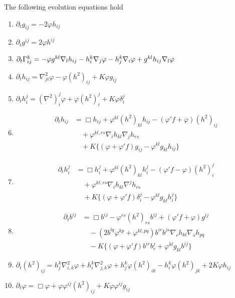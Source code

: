 \documentclass{amsart}
\begin{document}
\begin{lemma}
\label{lem:evolution}
The following evolution equations hold
\begin{enumerate}
\item \label{eq:delt_metric} $\partial_tg_{ij} = -2\varphi h_{ij}$
\item \label{eq:delt_inversemetric} $\partial_t g^{ij} = 2\varphi h^{ij}$
\item \label{eq:delt_christoffel} $\partial_t {\Gamma}^{k}_{ij} = -\varphi g^{kl} \nabla_l h_{ij} - h^k_i \nabla_j \varphi - h^k_j \nabla_i \varphi + g^{kl} h_{ij} \nabla_l \varphi$
\item \label{eq:delt_sff} $\partial_t h_{ij} = \nabla^2_{ji} \varphi - \varphi(h^2)_{ij} + K \varphi g_{ij}$
\item \label{eq:delt_weingarten} $\partial_t h_i^j = (\nabla^2)^j_i\varphi + \varphi(h^2)_i^j + K \varphi\delta_i^j$
\item \label{eq:delt_sff_box} \begin{align*}
\partial_t h_{ij} &= \Box h_{ij} + \varphi^{kl} (h^2)_{kl} h_{ij} - (\varphi'f + \varphi) (h^2)_{ij} \\
& \quad + \varphi^{kl,rs}\nabla_i h_{kl}\nabla_j h_{rs} \\
& \quad + K \{(\varphi + \varphi'f) g_{ij} - \varphi^{kl}g_{kl}h_{ij}\}
\end{align*}
\item \label{eq:delt_weingarten_box} \begin{align*}
\partial_t h_i^j &= \Box h_i^j + \varphi^{kl} (h^2)_{kl} h_i^j - (\varphi'f - \varphi) (h^2)_i^j \\
& \quad + \varphi^{kl,rs}\nabla_i h_{kl}\nabla^j h_{rs} \\
& \quad + K \{(\varphi + \varphi'f) \delta_i^j - \varphi^{kl}g_{kl}h_i^j\}
\end{align*}
\item \label{eq:delt_inversesff} \begin{align*}
\partial_t b^{ij} &= \Box b^{ij} - \varphi^{rs} (h^2)_{rs} b^{ij} + (\varphi'f + \varphi) g^{ij} \\  
& \quad - \left(2b^{lq}\varphi^{kp} + \varphi^{kl,pq}\right) b^{ir}b^{js} \nabla_r h_{kl} \nabla_s h_{pq} \\
& \quad - K \{(\varphi + \varphi'f) b^{ir}b^{j}_{r} + \varphi^{kl}g_{kl}b^{ij}\}
\end{align*}
\item \label{eq:delt_squaredsff} $\partial_t (h^2)_{ij} = h^k_j \nabla^2_{i,k} \varphi + h^k_i \nabla^2_{j,k} \varphi + h^k_j \varphi(h^2)_{ik} - h^k_i \varphi(h^2)_{jk} + 2K\varphi h_{ij}$
\item \label{eq:delt_speed} $\partial_t \varphi = \Box \varphi + \varphi\varphi^{ij}(h^2)_{ij} + K \varphi\varphi^{ij}g_{ij}$
\end{enumerate}
\end{lemma}
\end{document}
